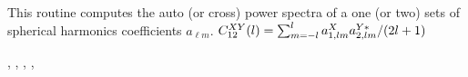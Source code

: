 
\sloppy


\section[alm2cl*]{ }
\label{sub:alm2cl}
\author{Eric Hivon}

\begin{facility}
{This routine computes the auto (or cross) power spectra of a one (or two) sets of spherical harmonics
  coefficients $a_{\ell m}$.
$C_{12}^{XY}(l) = \sum_{m=-l}^{l} a_{1,l m}^X
  a_{2,l m}^{Y*} / (2 l +1) $ }
{\modAlmTools}
\end{facility}

\begin{f90format}
{%
, %
, %
,  %
, %
}
\end{f90format}
\aboutoptional

